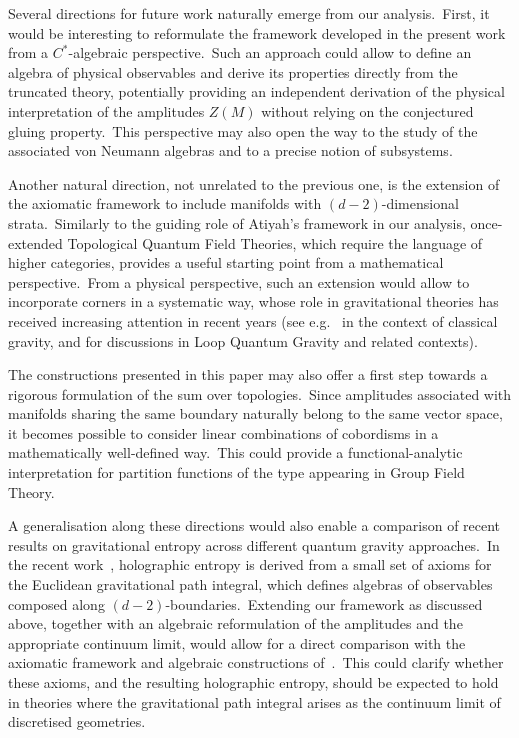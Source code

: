 \documentclass[11pt]{article}
\theoremstyle{definition}
\numberwithin{equation}{section}
\begin{document}
Several directions for future work naturally emerge from our analysis.~First, it would be interesting to reformulate the framework developed in the present work from a $C^*$-algebraic perspective.~Such an approach could allow to define an algebra of physical observables and derive its properties directly from the truncated theory, potentially providing an independent derivation of the physical interpretation of the amplitudes $Z(M)$ without relying on the conjectured gluing property.~This perspective may also open the way to the study of the associated von Neumann algebras and to a precise notion of subsystems.

Another natural direction, not unrelated to the previous one, is the extension of the axiomatic framework to include manifolds with $(d-2)$-dimensional strata.~Similarly to the guiding role of Atiyah's framework in our analysis, once-extended Topological Quantum Field Theories, which require the language of higher categories, provides a useful starting point from a mathematical perspective.~From a physical perspective, such an extension would allow to incorporate corners in a systematic way, whose role in gravitational theories has received increasing attention in recent years (see e.g.~\cite{Donnelly_Freidel_2016,Speranza:2017gxd,Freidel_Geiller_Pranzetti_2020a,Freidel_Geiller_Pranzetti_2020b,Freidel_Geiller_Pranzetti_2021,Ciambelli:2021nmv,Carrozza:2022xut} in the context of classical gravity, and \cite{Freidel:2016bxd,Freidel:2018pbr,Freidel:2019ees,Freidel:2023bnj} for discussions in Loop Quantum Gravity and related contexts).

The constructions presented in this paper may also offer a first step towards a rigorous formulation of the sum over topologies.~Since amplitudes associated with manifolds sharing the same boundary naturally belong to the same vector space, it becomes possible to consider linear combinations of cobordisms in a mathematically well-defined way.~This could provide a functional-analytic interpretation for partition functions of the type appearing in Group Field Theory.

A generalisation along these directions would also enable a comparison of recent results on gravitational entropy across different quantum gravity approaches.~In the recent work~\cite{Colafranceschi_Dong_Marolf_Wang_2024}, holographic entropy is derived from a small set of axioms for the Euclidean gravitational path integral, which defines algebras of observables composed along $(d-2)$-boundaries.~Extending our framework as discussed above, together with an algebraic reformulation of the amplitudes and the appropriate continuum limit, would allow for a direct comparison with the axiomatic framework and algebraic constructions of~\cite{Colafranceschi_Dong_Marolf_Wang_2024}.~This could clarify whether these axioms, and the resulting holographic entropy, should be expected to hold in theories where the gravitational path integral arises as the continuum limit of discretised geometries.
\end{document}
